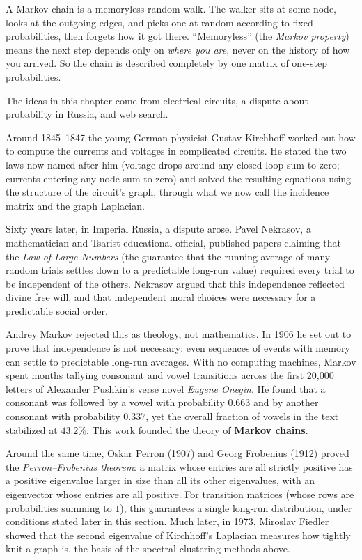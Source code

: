 \begin{intuitionbox}
A Markov chain is a memoryless random walk. The walker sits at some node, looks at the
outgoing edges, and picks one at random according to fixed probabilities, then forgets
how it got there. ``Memoryless'' (the \emph{Markov property}) means the next step depends
only on \emph{where you are}, never on the history of how you arrived. So the chain is
described completely by one matrix of one-step probabilities.
\end{intuitionbox}

\begin{historybox}
The ideas in this chapter come from electrical circuits, a dispute about probability in
Russia, and web search.

Around 1845--1847 the young German physicist Gustav Kirchhoff worked out how to compute the
currents and voltages in complicated circuits. He stated the two laws now named after him
(voltage drops around any closed loop sum to zero; currents entering any node sum to zero)
and solved the resulting equations using the structure of the circuit's graph, through what
we now call the incidence matrix and the graph Laplacian.

Sixty years later, in Imperial Russia, a dispute arose. Pavel Nekrasov, a mathematician and
Tsarist educational official, published papers claiming that the \emph{Law of Large
Numbers} (the guarantee that the running average of many random trials settles down to a
predictable long-run value) required every trial to be independent of the others. Nekrasov
argued that this independence reflected divine free will, and that independent moral
choices were necessary for a predictable social order.

Andrey Markov rejected this as theology, not mathematics. In 1906 he set out to prove that
independence is not necessary: even sequences of events with memory can settle to
predictable long-run averages. With no computing machines, Markov spent months tallying
consonant and vowel transitions across the first 20,000 letters of Alexander Pushkin's verse
novel \emph{Eugene Onegin}. He found that a consonant was followed by a vowel with
probability $0.663$ and by another consonant with probability $0.337$, yet the overall
fraction of vowels in the text stabilized at $43.2\%$. This work founded the theory of
\textbf{Markov chains}.

Around the same time, Oskar Perron (1907) and Georg Frobenius (1912) proved the
\emph{Perron--Frobenius theorem}: a matrix whose entries are all strictly positive has a
positive eigenvalue larger in size than all its other eigenvalues, with an eigenvector whose
entries are all positive. For transition matrices (whose rows are probabilities summing to
$1$), this guarantees a single long-run distribution, under conditions stated later in this
section. Much later, in 1973, Miroslav Fiedler showed that the second eigenvalue of
Kirchhoff's Laplacian measures how tightly knit a graph is, the basis of the spectral
clustering methods above.


\end{historybox}
